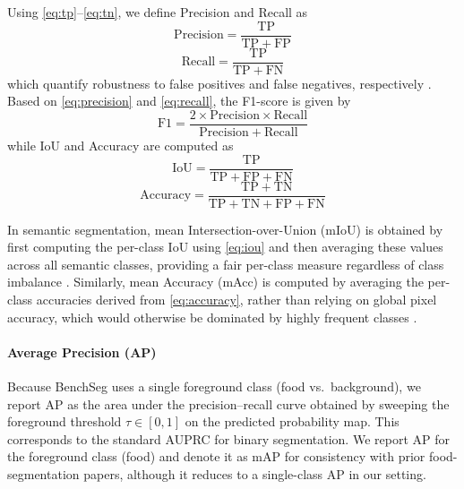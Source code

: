 \documentclass[preprint,12pt]{elsarticle}
\begin{document}
Using \eqref{eq:tp}–\eqref{eq:tn}, we define Precision and Recall as
\begin{equation}
\mathrm{Precision} = \frac{\mathrm{TP}}{\mathrm{TP} + \mathrm{FP}}
\label{eq:precision}
\end{equation}
\begin{equation}
\mathrm{Recall} = \frac{\mathrm{TP}}{\mathrm{TP} + \mathrm{FN}}
\label{eq:recall}
\end{equation}
which quantify robustness to false positives and false negatives, respectively \cite{papadopoulos2017training}. Based on \eqref{eq:precision} and \eqref{eq:recall}, the F1-score is given by
\begin{equation}
\mathrm{F1} = \frac{2 \times \mathrm{Precision} \times \mathrm{Recall}}{\mathrm{Precision} + \mathrm{Recall}}
\label{eq:f1}
\end{equation}
while IoU and Accuracy are computed as
\begin{equation}
\mathrm{IoU} = \frac{\mathrm{TP}}{\mathrm{TP} + \mathrm{FP} + \mathrm{FN}}
\label{eq:iou}
\end{equation}
\begin{equation}
\mathrm{Accuracy} = \frac{\mathrm{TP} + \mathrm{TN}}{\mathrm{TP} + \mathrm{TN} + \mathrm{FP} + \mathrm{FN}}
\label{eq:accuracy}
\end{equation}

In semantic segmentation, mean Intersection-over-Union (mIoU) is obtained by first computing the per-class IoU using \eqref{eq:iou} and then averaging these values across all semantic classes, providing a fair per-class measure regardless of class imbalance \cite{everingham2010pascal}. Similarly, mean Accuracy (mAcc) is computed by averaging the per-class accuracies derived from \eqref{eq:accuracy}, rather than relying on global pixel accuracy, which would otherwise be dominated by highly frequent classes \cite{long2015fully}.

\paragraph{Average Precision (AP)}
Because BenchSeg uses a single foreground class (food vs.\ background), we report AP as the area under the precision--recall curve obtained by sweeping the foreground threshold $\tau \in [0,1]$ on the predicted probability map. This corresponds to the standard AUPRC for binary segmentation. We report AP for the foreground class (food) and denote it as mAP for consistency with prior food-segmentation papers, although it reduces to a single-class AP in our setting.
\end{document}
